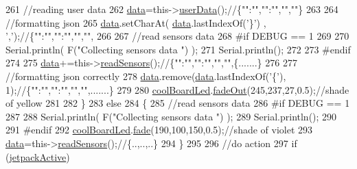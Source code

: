 \begin{DoxyCode}
261         \textcolor{comment}{//reading user data}
262         \hyperlink{classCoolBoard_a427fb753dd8575bdf821c70a5c63d695}{data}=this->\hyperlink{classCoolBoard_ae7358fb6e623cfc81b775f5f1734909b}{userData}();\textcolor{comment}{//\{"":"","":"","",""\}}
263 
264         \textcolor{comment}{//formatting json }
265         \hyperlink{classCoolBoard_a427fb753dd8575bdf821c70a5c63d695}{data}.setCharAt( \hyperlink{classCoolBoard_a427fb753dd8575bdf821c70a5c63d695}{data}.lastIndexOf(\textcolor{charliteral}{'\}'}) , \textcolor{charliteral}{','});\textcolor{comment}{//\{"":"","":"","","",}
266                 
267         \textcolor{comment}{//read sensors data}
268 \textcolor{preprocessor}{    #if DEBUG == 1}
269 
270         Serial.println( F(\textcolor{stringliteral}{"Collecting sensors data "}) );
271         Serial.println();
272     
273 \textcolor{preprocessor}{    #endif}
274 
275         \hyperlink{classCoolBoard_a427fb753dd8575bdf821c70a5c63d695}{data}+=this->\hyperlink{classCoolBoard_ad03abdce2e65f520bbf2cff0f2d083cf}{readSensors}();\textcolor{comment}{//\{"":"","":"","","",\{.......\}     }
276 
277         \textcolor{comment}{//formatting json correctly}
278         \hyperlink{classCoolBoard_a427fb753dd8575bdf821c70a5c63d695}{data}.remove(\hyperlink{classCoolBoard_a427fb753dd8575bdf821c70a5c63d695}{data}.lastIndexOf(\textcolor{charliteral}{'\{'}), 1);\textcolor{comment}{//\{"":"","":"","","",.......\}}
279         
280         \hyperlink{classCoolBoard_a1b1d3c684a5baa56b08486e192fd8e97}{coolBoardLed}.\hyperlink{classCoolBoardLed_a93d545679237e8cc858324367149775c}{fadeOut}(245,237,27,0.5);\textcolor{comment}{//shade of yellow}
281                 
282     \}   
283     \textcolor{keywordflow}{else}
284     \{
285         \textcolor{comment}{//read sensors data}
286 \textcolor{preprocessor}{    #if DEBUG == 1}
287 
288         Serial.println( F(\textcolor{stringliteral}{"Collecting sensors data "}) );
289         Serial.println();
290     
291 \textcolor{preprocessor}{    #endif}
292         \hyperlink{classCoolBoard_a1b1d3c684a5baa56b08486e192fd8e97}{coolBoardLed}.\hyperlink{classCoolBoardLed_af1cacbaa88db8bcf6042c1083ba41155}{fade}(190,100,150,0.5);\textcolor{comment}{//shade of violet        }
293         \hyperlink{classCoolBoard_a427fb753dd8575bdf821c70a5c63d695}{data}=this->\hyperlink{classCoolBoard_ad03abdce2e65f520bbf2cff0f2d083cf}{readSensors}();\textcolor{comment}{//\{..,..,..\}}
294     \}
295     
296     \textcolor{comment}{//do action}
297     \textcolor{keywordflow}{if} (\hyperlink{classCoolBoard_a9be03a913d26e558328935ca3b59a75e}{jetpackActive})

\end{DoxyCode}
